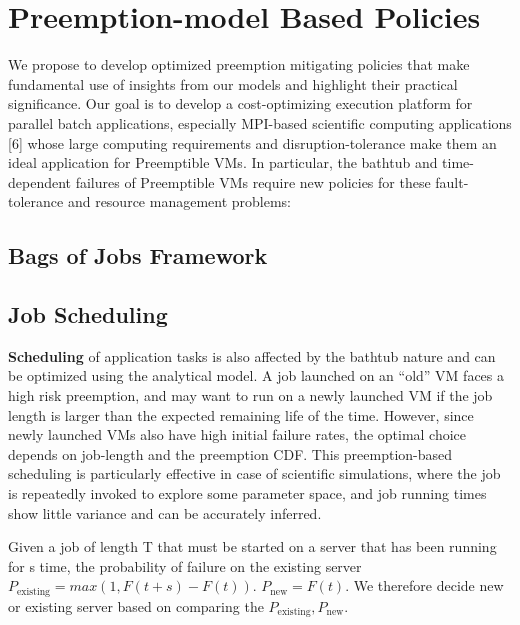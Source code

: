 
\section{Preemption-model Based Policies}

We propose to develop optimized preemption mitigating policies that make fundamental use of insights from our models and highlight their practical significance. 
Our goal is to develop a cost-optimizing execution platform for parallel batch applications, especially MPI-based scientific computing applications [6] whose large computing requirements and disruption-tolerance make them an ideal application for Preemptible VMs. 
In particular, the bathtub and time-dependent failures of Preemptible VMs require new policies for these fault-tolerance and resource management problems: 


\subsection{Bags of Jobs Framework}

\subsection{Job Scheduling}

\noindent \textbf{Scheduling} of application tasks is also affected by the bathtub nature and can be optimized using the analytical model. 
A job launched on an ``old''  VM faces a high risk preemption, and may want to run on a newly launched VM if the job length is larger than the expected remaining life of the time. 
However, since newly launched VMs also have high initial failure rates, the optimal choice depends on job-length and the preemption CDF.
This preemption-based scheduling is particularly effective in case of scientific simulations, where the job is repeatedly invoked to explore some parameter space, and job running times show little variance and can be accurately inferred. 


Given a job of length T that must be started on a server that has been running for s time, the probability of failure on the existing server $P_{\text{existing}} = max(1, F(t+s) - F(t))$.
$P_{\text{new}} = F(t)$. We therefore decide new or existing server based on comparing the $P_{\text{existing}}, P_{\text{new}}$. 

